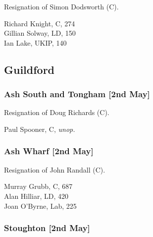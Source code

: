 \documentclass[a4paper,openany,10pt]{book}
\begin{document}

Resignation of Simon Dodsworth (C).



Richard Knight, C, 274\\
Gillian Solway, LD, 150\\
Ian Lake, UKIP, 140\\


\subsection*{Guildford}

\subsubsection*{Ash South and Tongham \hspace*{\fill}\nolinebreak[1]%
\enspace\hspace*{\fill}
[2nd May]}


Resignation of Doug Richards (C).



Paul Spooner, C, \emph{unop.}\\


\subsubsection*{Ash Wharf \hspace*{\fill}\nolinebreak[1]%
\enspace\hspace*{\fill}
[2nd May]}


Resignation of John Randall (C).



Murray Grubb, C, 687\\
Alan Hilliar, LD, 420\\
Joan O'Byrne, Lab, 225\\


\subsubsection*{Stoughton \hspace*{\fill}\nolinebreak[1]%
\enspace\hspace*{\fill}
[2nd May]}
\end{document}
